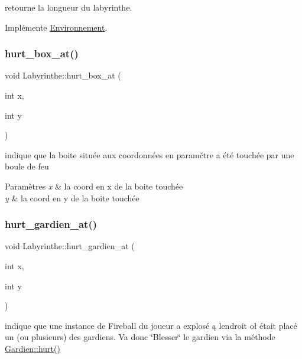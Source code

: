 retourne la longueur du labyrinthe. 



Implémente \hyperlink{classEnvironnement_af7629ab7f15ec65476eadcc80c46b50c}{Environnement}.

\mbox{\label{classLabyrinthe_a9e1bf06193f8e7763ebf733a9eaf4a17}} 
\subsubsection{\texorpdfstring{hurt\+\_\+box\+\_\+at()}{hurt\_box\_at()}}
{\footnotesize\ttfamily void Labyrinthe\+::hurt\+\_\+box\+\_\+at (\begin{DoxyParamCaption}\item[{int}]{x,  }\item[{int}]{y }\end{DoxyParamCaption})}



indique que la boite située aux coordonnées en paramčtre a été touchée par une boule de feu 


\begin{DoxyParams}{Paramètres}
{\em x} & la coord en x de la boite touchée \\
\hline
{\em y} & la coord en y de la boite touchée \\
\hline
\end{DoxyParams}
\mbox{\label{classLabyrinthe_a9c7c46b8c376f8b9ab0310ae1d0a369c}} 
\subsubsection{\texorpdfstring{hurt\+\_\+gardien\+\_\+at()}{hurt\_gardien\_at()}}
{\footnotesize\ttfamily void Labyrinthe\+::hurt\+\_\+gardien\+\_\+at (\begin{DoxyParamCaption}\item[{int}]{x,  }\item[{int}]{y }\end{DoxyParamCaption})}



indique que une instance de Fireball du joueur a explosé ą l\textquotesingle{}endroit oł était placé un (ou plusieurs) des gardiens. Va donc \char`\"{}\+Blesser\char`\"{} le gardien via la méthode \hyperlink{classGardien_ac4ba490e309de80c1449fc5baef90390}{Gardien\+::hurt()} 

